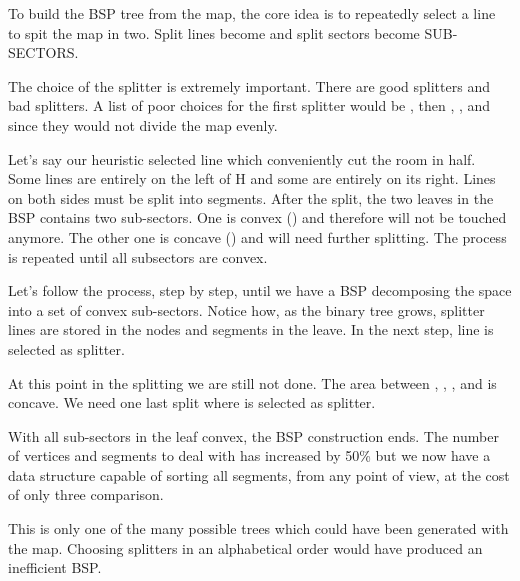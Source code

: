 \par
{}
\par
To build the BSP tree from the map, the core idea is to repeatedly select a line to spit the map in two. Split lines become  and split sectors become {SUB-SECTORS}.\\ 
\par
The choice of the splitter is extremely important. There are good splitters and bad splitters. A list of poor choices for the first splitter would be , then , , and  since they would not divide the map evenly.\\ 
\par
Let's say our heuristic selected line  which conveniently cut  the room in half. Some lines are entirely on the left of H and some are entirely on its right. Lines on both sides must be split into segments.  After the split, the two leaves in the BSP contains two sub-sectors. One is convex () and therefore will not be touched anymore. The other one is concave () and will need further splitting. The process is repeated until all subsectors are convex.\\
\par
{}
\par
Let's follow the process, step by step, until we have a BSP decomposing the space into a set of convex sub-sectors. Notice how, as the binary tree grows, splitter lines are stored in the nodes and segments in the leave. In the next step, line  is selected as splitter.
\par
{}
\par
At this point in the splitting we are still not done. The area between , , , and  is concave. We need one last split where  is selected as splitter.\\ 
\par
{}
\par
With all sub-sectors in the leaf convex, the BSP construction ends. The number of vertices and segments to deal with has increased by 50\% but we now have a data structure capable of sorting all segments, from any point of view, at the cost of only three comparison.\\
\par
This is only one of the many possible trees which could have been generated with the map. Choosing splitters in an alphabetical order would have produced an inefficient BSP.\\




